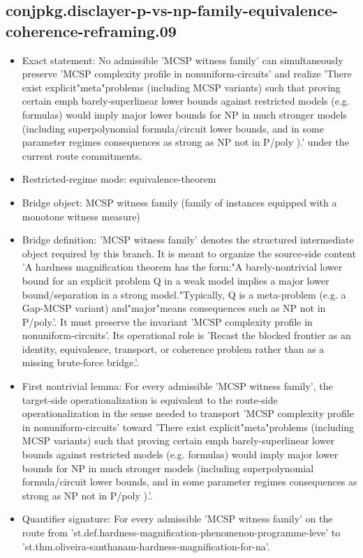 \documentclass[11pt]{article}
\begin{document}
\subsection*{conjpkg.disclayer-p-vs-np-family-equivalence-coherence-reframing.09}
\begin{itemize}
\item Exact statement: No admissible 'MCSP witness family' can simultaneously preserve 'MCSP complexity profile in nonuniform-circuits' and realize 'There exist explicit"meta"problems (including MCSP variants) such that proving certain emph barely-superlinear lower bounds against restricted models (e.g. formulas) would imply major lower bounds for NP in much stronger models (including superpolynomial formula/circuit lower bounds, and in some parameter regimes consequences as strong as NP not in P/poly ).' under the current route commitments.
\item Restricted-regime mode: equivalence-theorem
\item Bridge object: MCSP witness family (family of instances equipped with a monotone witness measure)
\item Bridge definition: 'MCSP witness family' denotes the structured intermediate object required by this branch. It is meant to organize the source-side content 'A hardness magnification theorem has the form:"A barely-nontrivial lower bound for an explicit problem Q in a weak model implies a major lower bound/separation in a strong model."Typically, Q is a meta-problem (e.g. a Gap-MCSP variant) and"major"means consequences such as NP not in P/poly.'. It must preserve the invariant 'MCSP complexity profile in nonuniform-circuits'. Its operational role is 'Recast the blocked frontier as an identity, equivalence, transport, or coherence problem rather than as a missing brute-force bridge.'.
\item First nontrivial lemma: For every admissible 'MCSP witness family', the target-side operationalization is equivalent to the route-side operationalization in the sense needed to transport 'MCSP complexity profile in nonuniform-circuits' toward 'There exist explicit"meta"problems (including MCSP variants) such that proving certain emph barely-superlinear lower bounds against restricted models (e.g. formulas) would imply major lower bounds for NP in much stronger models (including superpolynomial formula/circuit lower bounds, and in some parameter regimes consequences as strong as NP not in P/poly ).'.
\item Quantifier signature: For every admissible 'MCSP witness family' on the route from 'st.def.hardness-magnification-phenomenon-programme-leve' to 'st.thm.oliveira-santhanam-hardness-magnification-for-na'.

\end{itemize}
\end{document}
